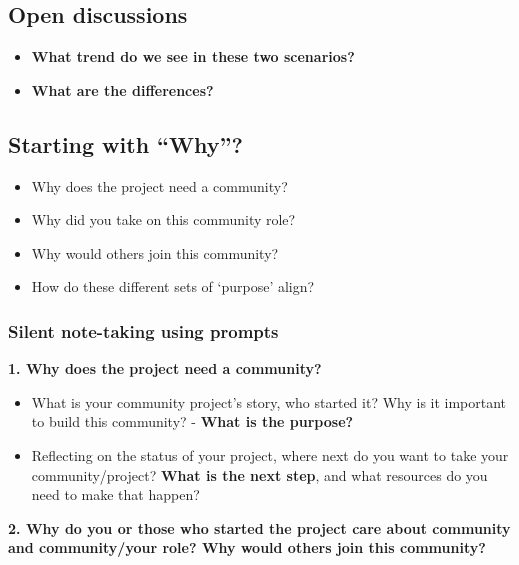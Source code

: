 \documentclass[
  letterpaper,
  DIV=11,
  numbers=noendperiod]{scrreport}
\providecommand{\tightlist}{%
  \setlength{\itemsep}{0pt}\setlength{\parskip}{0pt}}\usepackage{longtable,booktabs,array}
\begin{document}
\hypertarget{open-discussions}{%
\subsection{Open discussions}\label{open-discussions}}

\begin{itemize}
\tightlist
\item
  \textbf{What trend do we see in these two scenarios?}
\item
  \textbf{What are the differences?}
\end{itemize}

\hypertarget{starting-with-why}{%
\subsection{Starting with ``Why''?}\label{starting-with-why}}

\begin{itemize}
\tightlist
\item
  Why does the project need a community?
\item
  Why did you take on this community role?
\item
  Why would others join this community?
\item
  How do these different sets of `purpose' align?
\end{itemize}

\hypertarget{silent-note-taking-using-prompts}{%
\subsubsection{\texorpdfstring{\textbf{Silent note-taking using
prompts}}{Silent note-taking using prompts}}\label{silent-note-taking-using-prompts}}

\textbf{1. Why does the project need a community?}

\begin{itemize}
\tightlist
\item
  What is your community project's story, who started it? Why is it
  important to build this community? - \textbf{What is the purpose?}
\item
  Reflecting on the status of your project, where next do you want to
  take your community/project? \textbf{What is the next step}, and what
  resources do you need to make that happen?
\end{itemize}

\textbf{2. Why do you or those who started the project care about
community and community/your role? Why would others join this
community?}
\end{document}
